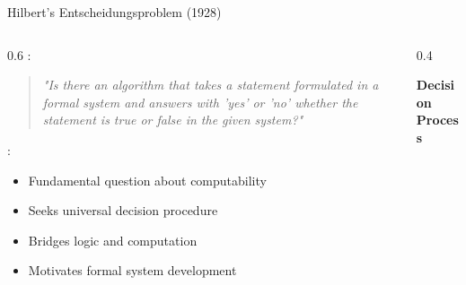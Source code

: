 \begin{frame}{Hilbert's Entscheidungsproblem (1928)}
\begin{columns}
\begin{column}{0.6\textwidth}
:
\begin{quote}
\textit{"Is there an algorithm that takes a statement formulated in a formal system and answers with 'yes' or 'no' whether the statement is true or false in the given system?"}
\end{quote}

\vspace{0.3cm}
:
\begin{itemize}
\item Fundamental question about computability
\item Seeks universal decision procedure
\item Bridges logic and computation
\item Motivates formal system development
\end{itemize}
\end{column}
\begin{column}{0.4\textwidth}
\begin{center}
\textbf{Decision Process}
\vspace{0.3cm}

\end{center}
\end{column}
\end{columns}
\end{frame}

